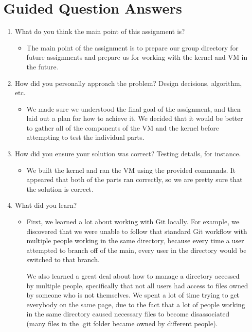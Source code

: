 \documentclass[10pt,draftclsnofoot,onecolumn]{IEEEtran}
\begin{document}
    \section{Guided Question Answers}
    \begin{enumerate}
	\item What do you think the main point of this assignment is?
    	\begin{itemize}
    	\item The main point of the assignment is to prepare our group directory for future assignments and prepare us for working with the kernel and VM in the future.
        \end{itemize}
    \item How did you personally approach the problem? Design decisions, algorithm, etc.
    	\begin{itemize}
        \item We made sure we understood the final goal of the assignment, and then laid out a plan for how to achieve it. We decided that it would be better to gather all of the components of the VM and the kernel before attempting to test the individual parts.
        \end{itemize}
    \item How did you ensure your solution was correct? Testing details, for instance.
    	\begin{itemize}
        \item We built the kernel and ran the VM using the provided commands. It appeared that both of the parts ran correctly, so we are pretty sure that the solution is correct.
        \end{itemize}
    \item What did you learn?
    	\begin{itemize}
        \item First, we learned a lot about working with Git locally. For example, we discovered that we were unable to follow that standard Git workflow with multiple people working in the same directory, because every time a user attempted to branch off of the main, every user in the directory would be switched to that branch.\par
        We also learned a great deal about how to manage a directory accessed by multiple people, specifically that not all users had access to files owned by someone who is not themselves. We spent a lot of time trying to get everybody on the same page, due to the fact that a lot of people working in the same directory caused necessary files to become disassociated (many files in the .git folder became owned by different people).
        \end{itemize}
	\end{enumerate}
    
\end{document}
